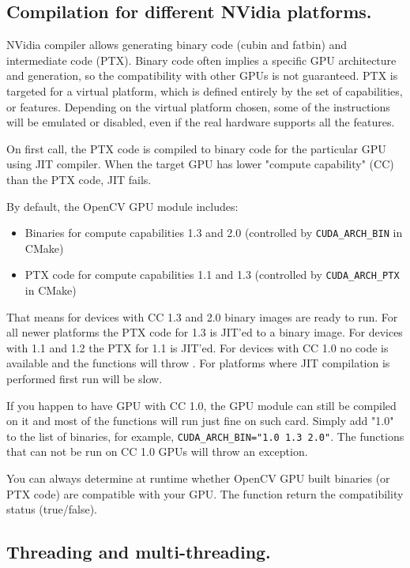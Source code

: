 \subsection{Compilation for different NVidia platforms.}

NVidia compiler allows generating binary code (cubin and fatbin) and intermediate code (PTX). Binary code often implies a specific GPU architecture and generation, so the compatibility with other GPUs is not guaranteed. PTX is targeted for a virtual platform, which is defined entirely by the set of capabilities, or features. Depending on the virtual platform chosen, some of the instructions will be emulated or disabled, even if the real hardware supports all the features.

On first call, the PTX code is compiled to binary code for the particular GPU using JIT compiler. When the target GPU has lower "compute capability" (CC) than the PTX code, JIT fails. 

By default, the OpenCV GPU module includes:
\begin{itemize}
\item Binaries for compute capabilities 1.3 and 2.0 (controlled by \texttt{CUDA\_ARCH\_BIN} in CMake)
\item PTX code for compute capabilities 1.1 and 1.3 (controlled by \texttt{CUDA\_ARCH\_PTX} in CMake)
\end{itemize}

That means for devices with CC 1.3 and 2.0 binary images are ready to run. For all newer platforms the PTX code for 1.3 is JIT'ed to a binary image. For devices with 1.1 and 1.2 the PTX for 1.1 is JIT'ed. For devices with CC 1.0 no code is available and the functions will throw . For platforms where JIT compilation is performed first run will be slow.

If you happen to have GPU with CC 1.0, the GPU module can still be compiled on it and most of the functions will run just fine on such card. Simply add "1.0" to the list of binaries, for example, \texttt{CUDA\_ARCH\_BIN="1.0 1.3 2.0"}. The functions that can not be run on CC 1.0 GPUs will throw an exception.

You can always determine at runtime whether OpenCV GPU built binaries (or PTX code) are compatible with your GPU. The function  return the compatibility status (true/false).


\subsection{Threading and multi-threading.}

